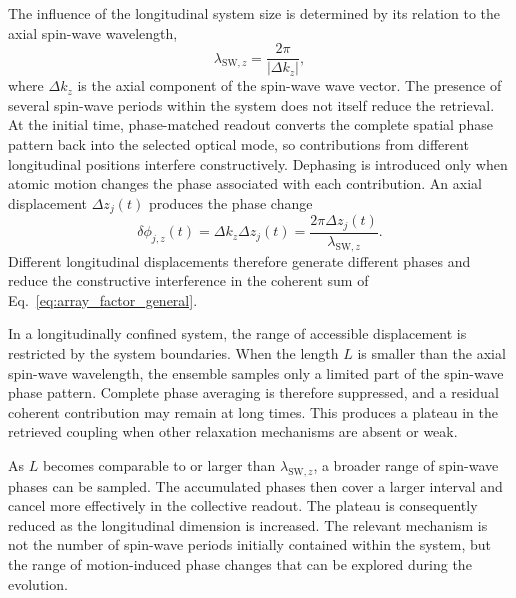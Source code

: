 The influence of the longitudinal system size is determined by its relation to the axial spin-wave wavelength,
\begin{equation}
    \lambda_{\mathrm{SW},z}
    =
    \frac{2\pi}{|\Delta k_z|},
    \label{eq:results_axial_spin_wave_wavelength}
\end{equation}
where $\Delta k_z$ is the axial component of the spin-wave wave vector. The presence of several spin-wave periods within the system does not itself reduce the retrieval. At the initial time, phase-matched readout converts the complete spatial phase pattern back into the selected optical mode, so contributions from different longitudinal positions interfere constructively. Dephasing is introduced only when atomic motion changes the phase associated with each contribution. An axial displacement $\Delta z_j(t)$ produces the phase change
\begin{equation}
    \delta\phi_{j,z}(t)
    =
    \Delta k_z\Delta z_j(t)
    =
    \frac{2\pi\Delta z_j(t)}
         {\lambda_{\mathrm{SW},z}}.
    \label{eq:results_axial_motion_phase}
\end{equation}
Different longitudinal displacements therefore generate different phases and reduce the constructive interference in the coherent sum of Eq.~\eqref{eq:array_factor_general}.

In a longitudinally confined system, the range of accessible displacement is restricted by the system boundaries. When the length $L$ is smaller than the axial spin-wave wavelength, the ensemble samples only a limited part of the spin-wave phase pattern. Complete phase averaging is therefore suppressed, and a residual coherent contribution may remain at long times. This produces a plateau in the retrieved coupling when other relaxation mechanisms are absent or weak.

As $L$ becomes comparable to or larger than $\lambda_{\mathrm{SW},z}$, a broader range of spin-wave phases can be sampled. The accumulated phases then cover a larger interval and cancel more effectively in the collective readout. The plateau is consequently reduced as the longitudinal dimension is increased. The relevant mechanism is not the number of spin-wave periods initially contained within the system, but the range of motion-induced phase changes that can be explored during the evolution.

